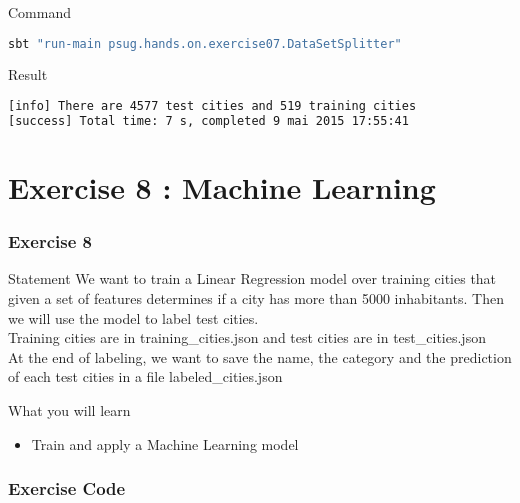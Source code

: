 \documentclass[slidetop,9pt,utf8]{beamer}
\begin{document}
\begin{CJK}{UTF8}{gbsn}
\begin{frame}[fragile]
  \begin{block}{Command}
    \begin{lstlisting}[language=bash, style=terminal]
sbt "run-main psug.hands.on.exercise07.DataSetSplitter"  
    \end{lstlisting}
  \end{block}

  \begin{block}{Result}
    \begin{lstlisting}[language=bash, style=terminal]
[info] There are 4577 test cities and 519 training cities
[success] Total time: 7 s, completed 9 mai 2015 17:55:41
    \end{lstlisting}
  \end{block}

\end{frame}

\section{Exercise 8 : Machine Learning}

\begin{frame}
  \frametitle{Exercise 8}

  \begin{block}{Statement}
    We want to train a Linear Regression model over training cities that given a set of features determines if a city has more than 5000 inhabitants. Then we will use the model to label test cities. 
\\ \medskip
Training cities are in training\_cities.json and test cities are in test\_cities.json
\\ \medskip
At the end of labeling, we want to save the name, the category and the prediction of each test cities in a file labeled\_cities.json
  \end{block}

  \begin{block}{What you will learn}
    \begin{itemize}
      \item Train and apply a Machine Learning model
    \end{itemize}
  \end{block}

\end{frame}

\begin{frame}
  \frametitle{Exercise Code}

  


\end{frame}
\end{CJK}
\end{document}
